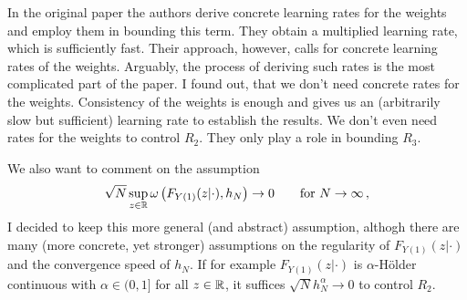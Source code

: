 \begin{remark}
In the original paper \cite{Wang2019} the authors derive concrete learning rates for the weights and employ them in bounding this term. They obtain a multiplied learning rate, which is sufficiently fast. Their approach, however, calls for concrete learning rates of the weights. Arguably, the process of deriving such rates is the most complicated part of the paper. 
I found out, that we don't need concrete rates for the weights. 
Consistency of the weights is enough and gives us an (arbitrarily slow but sufficient) learning rate to establish the results.
We don't even need rates for the weights to control $R_2$.
They only play a role in bounding $R_3$.

We also want to comment on the assumption
\begin{gather*}
  \sqrt{N}
  \sup_{z\in\R}
  \omega
  \left( 
    F_{Y(1)}(z|\cdot)
    ,h_N
  \right)
  \to
  0
  \qquad
  \text{for}\ 
  N\to \infty
  \,,
\end{gather*}
I decided to keep this more general (and abstract) assumption, althogh
there are many (more concrete, yet stronger) assumptions on the regularity of
$
    F_{Y(1)}(z|\cdot)
$
and the convergence speed of $h_N$.
If for example 
$
    F_{Y(1)}(z|\cdot)
$
is $\alpha$-Hölder continuous with $\alpha\in(0,1]$ for all $z\in\mathbb{R}$, it suffices $\sqrt{N}h_N^\alpha\to0$ to control $R_2$.
\end{remark}


